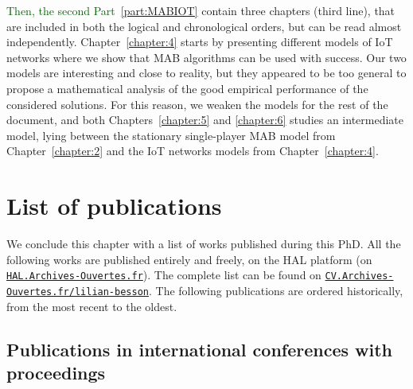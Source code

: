 \textcolor{darkgreen}{Then, the second Part~\ref{part:MABIOT}} contain three chapters (third line), that are included in both the logical and chronological orders, but can be read almost independently.
Chapter~\ref{chapter:4} starts by presenting different models of IoT networks where we show that MAB algorithms can be used with success.
Our two models are interesting and close to reality, but they appeared to be too general to propose a mathematical analysis of the good empirical performance of the considered solutions.
For this reason, we weaken the models for the rest of the document,
and both Chapters~\ref{chapter:5} and \ref{chapter:6} studies an intermediate model, lying between the stationary single-player MAB model from Chapter~\ref{chapter:2} and the IoT networks models from Chapter~\ref{chapter:4}.




\section{List of publications}
\label{sec:1:listPublications}


We conclude this chapter with a list of works published during this PhD.
All the following works are published entirely and freely, on the HAL platform (on \href{https://hal.archives-ouvertes.fr/}{\texttt{HAL.Archives-Ouvertes.fr}}).
The complete list can be found on
\href{https://cv.archives-ouvertes.fr/lilian-besson/}{\texttt{CV.Archives-Ouvertes.fr/lilian-besson}}.
%
The following publications are ordered historically, from the most recent to the oldest.


\subsection*{Publications in international conferences with proceedings}

